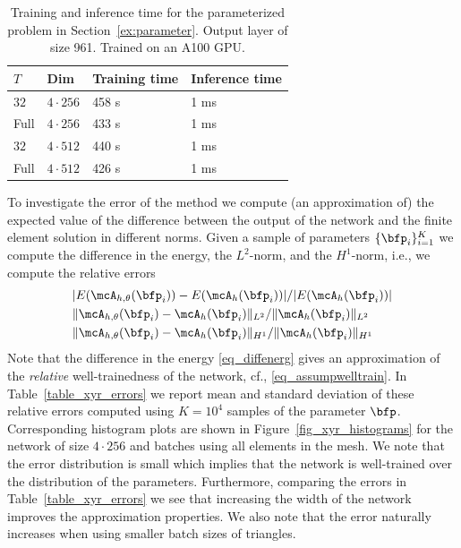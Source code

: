 \documentclass[12pt]{article}
\begin{document}
\begin{table}[h!]
	\caption{Training and inference time for the parameterized problem in Section~\ref{ex:parameter}. Output layer of size 961. Trained on an A100 GPU.}
	\centering
	\begin{tabular}{|l|l|l|l|}
		\hline
		$T$ & Dim & Training time & Inference time \\ \hline
		$32$ & $4 \cdot 256$ & 458 s &  1 ms\\  \hline
		Full & $4 \cdot 256$ & 433 s &  1 ms\\ \hline
		$32$ & $4 \cdot 512$ & 440 s & 1 ms \\ \hline
		Full & $4 \cdot 512$ & 426 s & 1 ms \\ \hline
	\end{tabular}\label{table_xyr_times}
\end{table}

To investigate the error of the method we compute (an approximation of) the expected value of the difference between the output of the network and the finite element solution in different norms. Given a sample of parameters $\{\bfp_i \}_{i=1}^K$ we compute the difference in the energy, the $L^2$-norm, and the $H^1$-norm, i.e., we compute the relative errors
\begin{align}
	&|E(\mcA_{h,\theta}(\bfp_i)) - E(\mcA_{h}(\bfp_i))|/|E(\mcA_{h}(\bfp_i))| \label{eq_diffenerg} \\
	&\|\mcA_{h,\theta}(\bfp_i) - \mcA_{h}(\bfp_i)\|_{L^2}/\|\mcA_{h}(\bfp_i)\|_{L^2} \\
	&\|\mcA_{h,\theta}(\bfp_i) - \mcA_{h}(\bfp_i)\|_{H^1}/\|\mcA_{h}(\bfp_i)\|_{H^1}
\end{align}
Note that the difference in the energy \eqref{eq_diffenerg} gives an approximation of the \emph{relative} well-trainedness of the network, cf., \eqref{eq_assumpwelltrain}. In Table~\ref{table_xyr_errors} we report mean and standard deviation of these relative errors computed using $K=10^4$ samples of the parameter $\bfp$. Corresponding histogram plots are shown in Figure~\ref{fig_xyr_histograms} for the network of size $4\cdot 256$ and batches using all elements in the mesh. We note that the error distribution is small which implies that the network is well-trained over the distribution of the parameters. Furthermore, comparing the errors in Table~\ref{table_xyr_errors} we see that increasing the width of the network improves the approximation properties. We also note that the error naturally increases when using smaller batch sizes of triangles.
\end{document}
